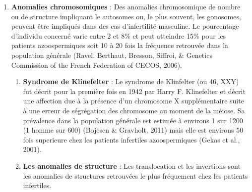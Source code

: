 \documentclass[12pt,twoside]{reedthesis}
\providecommand{\tightlist}{%
  \setlength{\itemsep}{0pt}\setlength{\parskip}{0pt}}
\theoremstyle{definition}
\theoremstyle{definition}
\theoremstyle{remark}
\begin{document}
  \begin{enumerate}
  \def\labelenumi{\arabic{enumi}.}
  \setcounter{enumi}{1}
  \tightlist
  \item
    \textbf{Anomalies chromosomiques} : Des anomalies chromosomique de
    nombre ou de structure impliquant le autosomes ou, le plus souvent,
    les gonosomes, peuvent être impliqués dans des cas d'infertilité
    masculine. Le pourcentage d'individu concerné varie entre 2 et 8\% et
    peut atteindre 15\% pour les patients azoospermiques soit 10 à 20 fois
    la fréquence retrouvée dans la population générale (Ravel, Berthaut,
    Bresson, Siffroi, \& Genetics Commission of the French Federation of
    CECOS, 2006).
  
    \begin{enumerate}
    \def\labelenumii{\alph{enumii}.}
    \tightlist
    \item
      \textbf{Syndrome de Klinefelter} : Le syndrome de Klinfelter (ou 46,
      XXY) fut décrit pour la première fois en 1942 par Harry F.
      Klinefelter et décrit une affection due à la présence d'un
      chromosome X supplémentaire suite à une erreur de ségrégation des
      chromosome au moment de la méiose. Sa prévalence dans la population
      générale est estimée à environs 1 sur 1200 (1 homme sur 600)
      (Bojesen \& Gravholt, 2011) mais elle est environs 50 fois
      superieure chez les patients infertiles azoospermiques (Gekas et
      al., 2001).\\
    \item
      \textbf{Les anomalies de structure} : Les translocation et les
      invertions sont les anomalies de structures retrouvées le plus
      fréquement chez les patients infertiles.
  

\end{enumerate}
\end{enumerate}
\end{document}
